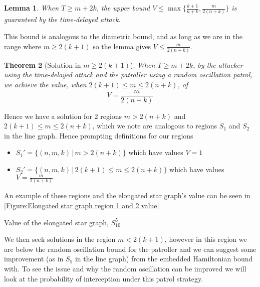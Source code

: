 \documentclass[a4paper,10pt]{article}
\newtheorem{theorem}{Theorem}[section]
\newtheorem{lemma}[theorem]{Lemma}
\theoremstyle{definition}
\theoremstyle{definition}
\theoremstyle{remark}
\theoremstyle{definition}
\begin{document}
\begin{lemma}
When $T \geq m+2k$, the upper bound $V \leq \max \{ \frac{k+1}{n+k} , \frac{m}{2(n+k)}   \}$  is guaranteed by the time-delayed attack.
\end{lemma}

This bound is analogous to the diametric bound, and as long as we are in the range where $m \geq 2(k+1)$ so the lemma gives $V \leq \frac{m}{2(n+k)}$.

\begin{theorem}[Solution in $m \geq 2(k+1)$]
When $T \geq m+2k$, by the attacker using the time-delayed attack and the patroller using a random oscillation patrol, we achieve the value, when $2(k+1) \leq m \leq 2(n+k)$, of
$$V=\frac{m}{2(n+k)}$$
\end{theorem}

Hence we have a solution for 2 regions $m > 2(n+k)$ and $2(k+1) \leq m \leq 2(n+k)$, which we note are analogous to regions $S_{1}$ and $S_{2}$ in the line graph. Hence prompting definitions for our regions

\begin{itemize}
\item $S_{1}' = \{(n,m,k) \, | \, m > 2(n+k) \}$ which have values $V=1$
\item $S_{2}' = \{(n,m,k) \, | \, 2(k+1) \leq m \leq 2(n+k) \}$ which have values $V=\frac{m}{2(n+k)}$
\end{itemize}

An example of these regions and the elongated star graph's value can be seen in \ref{Figure:Elongated star graph region 1 and 2 value}.

\begin{myfigure}
\begin{center}

\end{center}
\caption{Value of the elongated star graph, $S_{10}^{5}$}
\label{Figure:Elongated star graph region 1 and 2 value}
\end{myfigure}

We then seek solutions in the region $m < 2(k+1)$, however in this region we are below the random oscillation bound for the patroller and we can suggest some improvement (as in $S_{5}$ in the line graph) from the embedded Hamiltonian bound with. To see the issue and why the random oscillation can be improved we will look at the probability of interception under this patrol strategy.
\end{document}
